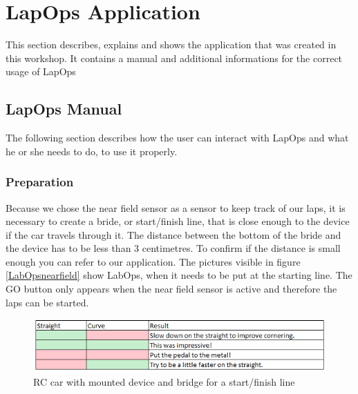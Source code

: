 \chapter{LapOps Application}\label{manual}
This section describes, explains and shows the application that was created in this workshop. It contains a manual and additional informations for the correct usage of LapOps

\section{LapOps Manual}
The following section describes how the user can interact with LapOps and what he or she needs to do, to use it properly.

\subsection{Preparation}
Because we chose the near field sensor as a sensor to keep track of our laps, it is necessary to create a bride, or start/finish line, that is close enough to the device if the car travels through it. The distance between the bottom of the bride and the device has to be less than 3 centimetres. To confirm if the distance is small enough you can refer to our application. The pictures visible in figure \ref{LabOpsnearfield} show LabOps, when it needs to be put at the starting line. The GO button only appears when the near field sensor is active and therefore the laps can be started.

\begin{figure}[H]
	\centering
	\includegraphics[scale= 0.9]{Pictures/StraightResultMapping.png}
	\caption{RC car with mounted device and bridge for a start/finish line}
	\label{startFinishLineWithRC}
\end{figure}

